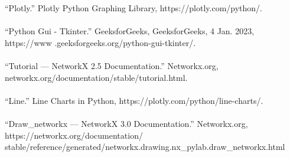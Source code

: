 \documentclass[fontsize=11pt]{article}
\begin{document}
“Plotly.” Plotly Python Graphing Library, https://plotly.com/python/.
\\\\
“Python Gui - Tkinter.” GeeksforGeeks, GeeksforGeeks, 4 Jan. 2023, https://www .geeksforgeeks.org/python-gui-tkinter/.
\\\\
“Tutorial — NetworkX 2.5 Documentation.” Networkx.org, networkx.org/documentation/stable/tutorial.html.
\\
\\
    “Line.” Line Charts in Python, https://plotly.com/python/line-charts/.
\\\\
“Draw\_networkx — NetworkX 3.0 Documentation.” Networkx.org,
https://networkx.org/documentation/ \\stable/reference/generated/networkx.drawing.nx\_pylab.draw\_networkx.html





\end{document}
